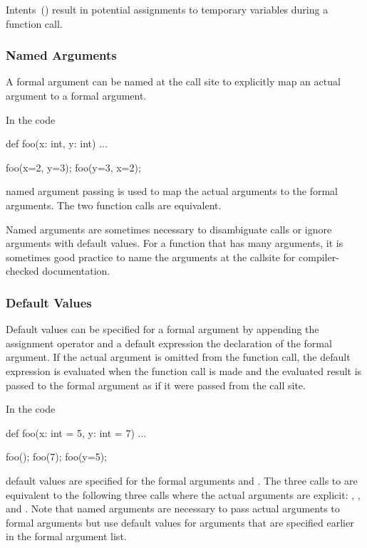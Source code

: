 Intents~() result in potential assignments to temporary
variables during a function call.

\subsubsection{Named Arguments}
\label{Named_Arguments}

A formal argument can be named at the call site to explicitly map an
actual argument to a formal argument.

\begin{example}
In the code
\begin{chapel}
def foo(x: int, y: int) { ... }

foo(x=2, y=3);
foo(y=3, x=2);
\end{chapel}
named argument passing is used to map the actual arguments to the
formal arguments.  The two function calls are equivalent.
\end{example}

Named arguments are sometimes necessary to disambiguate calls or
ignore arguments with default values.  For a function that has many
arguments, it is sometimes good practice to name the arguments at the
callsite for compiler-checked documentation.

\subsubsection{Default Values}
\label{Default_Values}

Default values can be specified for a formal argument by appending the
assignment operator and a default expression the declaration of the
formal argument.  If the actual argument is omitted from the function
call, the default expression is evaluated when the function call is
made and the evaluated result is passed to the formal argument as if
it were passed from the call site.

\begin{example}
In the code
\begin{chapel}
def foo(x: int = 5, y: int = 7) { ... }

foo();
foo(7);
foo(y=5);
\end{chapel}
default values are specified for the formal arguments 
and .  The three calls to  are equivalent to the
following three calls where the actual arguments are
explicit: , , and .
Note that named arguments are necessary to pass actual arguments to
formal arguments but use default values for arguments that are
specified earlier in the formal argument list.
\end{example}


